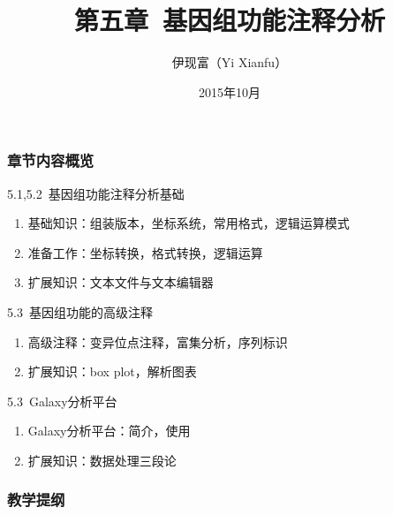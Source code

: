 




\title[基因组功能注释分析]{第五章\ 基因组功能注释分析}
\author[Yixf]{伊现富（Yi Xianfu）}
\date{2015年10月}

\begin{frame}
  \titlepage
\end{frame}

\begin{frame}
  \frametitle{章节内容概览}
  \begin{block}{5.1,5.2\ 基因组功能注释分析基础}
    \begin{enumerate}
      \item 基础知识：组装版本，坐标系统，常用格式，逻辑运算模式
      \item 准备工作：坐标转换，格式转换，逻辑运算
      \item 扩展知识：文本文件与文本编辑器
    \end{enumerate}
  \end{block}
  \begin{block}{5.3\ 基因组功能的高级注释}
    \begin{enumerate}
      \item 高级注释：变异位点注释，富集分析，序列标识
      \item 扩展知识：box plot，解析图表
    \end{enumerate}
  \end{block}
  \begin{block}{5.3\ Galaxy分析平台}
    \begin{enumerate}
      \item Galaxy分析平台：简介，使用
      \item 扩展知识：数据处理三段论
    \end{enumerate}
  \end{block}
\end{frame}

\begin{frame}[plain]
  \frametitle{教学提纲}
  \setcounter{tocdepth}{2}
  \begin{multicols}{2}
  \tableofcontents
  \end{multicols}
\end{frame}








